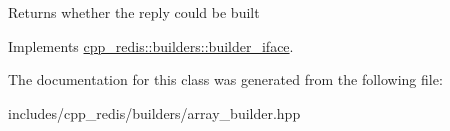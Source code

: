 \begin{DoxyReturn}{Returns}
whether the reply could be built 
\end{DoxyReturn}


Implements \mbox{\hyperlink{classcpp__redis_1_1builders_1_1builder__iface_a40db9a31d4ea1771777e74146d31e12d}{cpp\+\_\+redis\+::builders\+::builder\+\_\+iface}}.



The documentation for this class was generated from the following file\+:\begin{DoxyCompactItemize}
\item 
includes/cpp\+\_\+redis/builders/array\+\_\+builder.\+hpp\end{DoxyCompactItemize}
